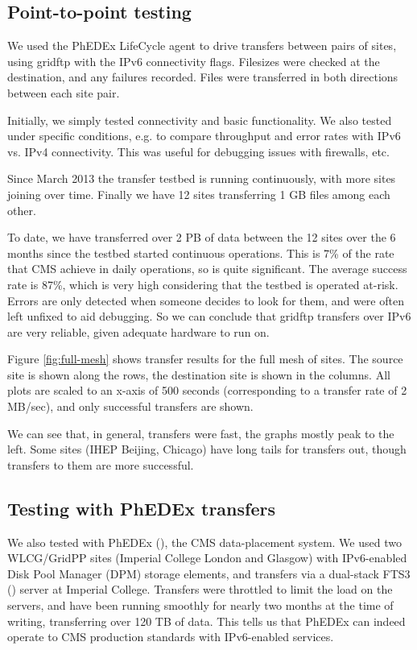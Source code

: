 \subsection{Point-to-point testing}

We used the PhEDEx LifeCycle agent \cite{LifeCycle} to drive transfers between pairs of sites, using gridftp with the IPv6 connectivity flags. Filesizes were checked at the destination, and any failures recorded. Files were transferred in both directions between each site pair.

Initially, we simply tested connectivity and basic functionality. We also tested under specific conditions, e.g. to compare throughput and error rates with IPv6 vs. IPv4 connectivity. This was useful for debugging issues with firewalls, etc.

Since March 2013 the transfer testbed is running continuously, with more sites joining over time. Finally we have 12 sites transferring 1 GB files among each other.

To date, we have transferred over 2 PB of data between the 12 sites over the 6 months since the testbed started continuous operations. This is 7\% of the rate that CMS \cite{cms} achieve in daily operations, so is quite significant. The average success rate is 87\%, which is very high considering that the testbed is operated at-risk. Errors are only detected when someone decides to look for them, and were often left unfixed to aid debugging.
So we can conclude that gridftp transfers over IPv6 are very reliable, given adequate hardware to run on.

Figure \ref{fig:full-mesh} shows transfer results for the full mesh of sites. The source site is shown along the rows, the destination site is shown in the columns. All plots are scaled to an x-axis of 500 seconds (corresponding to a transfer rate of 2 MB/sec), and only successful transfers are shown.

We can see that, in general, transfers were fast, the graphs mostly peak to the left. Some sites (IHEP Beijing, Chicago) have long tails for transfers out, though transfers to them are more successful.

\subsection{Testing with PhEDEx transfers}
We also tested with PhEDEx (\cite{PhEDEx}), the CMS data-placement system. We used two WLCG/GridPP sites (Imperial College London and Glasgow) with IPv6-enabled Disk Pool Manager (DPM) storage elements, and transfers via a dual-stack FTS3 (\cite{FTS3}) server at Imperial College. Transfers were throttled to limit the load on the servers, and have been running smoothly for nearly two months at the time of writing, transferring over 120 TB of data. This tells us that PhEDEx can indeed operate to CMS production standards with IPv6-enabled services.

